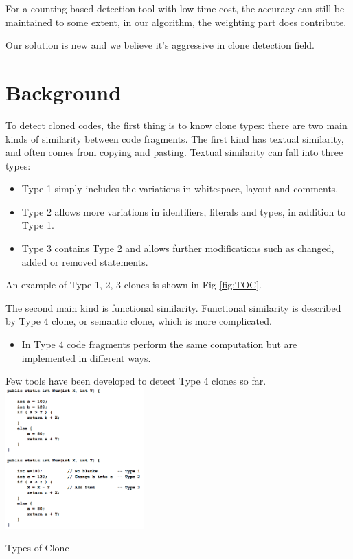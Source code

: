 \documentclass[conference]{IEEEtran}
\makeatletter
\newenvironment{figurehere}
  {\def\@captype{figure}}
  {}
\makeatother
\begin{document}
For a counting based detection tool with low time cost, the accuracy can still be maintained to some extent, in our algorithm, the weighting part does contribute.

Our solution is new and we believe it's aggressive in clone detection field.


\section{Background}

To detect cloned codes, the first thing is to know clone types: there are two main kinds of similarity between code fragments. The first kind has textual similarity, and often comes from copying and pasting. Textual similarity can fall into three types: 
\begin{itemize}
\item Type 1 simply includes the variations in whitespace, layout and comments. 
\item Type 2 allows more variations in identifiers, literals and types, in addition to Type 1.
\item Type 3 contains Type 2 and allows further modifications such as changed, added or removed statements. 
\end{itemize}

An example of Type 1, 2, 3 clones is shown in Fig \ref{fig:TOC}. 

The second main kind is functional similarity. Functional similarity is described by Type 4 clone, or semantic clone, which is more complicated. 
\begin{itemize}
\item In Type 4 code fragments perform the same computation but are implemented in different ways. 
\end{itemize}

Few tools have been developed to detect Type 4 clones so far.\\


\begin{figurehere}
\centering \includegraphics[width=0.4\textwidth]{graph2_1} \caption{Types of Clone} \label{fig:TOC}
\end{figurehere}
\end{document}
